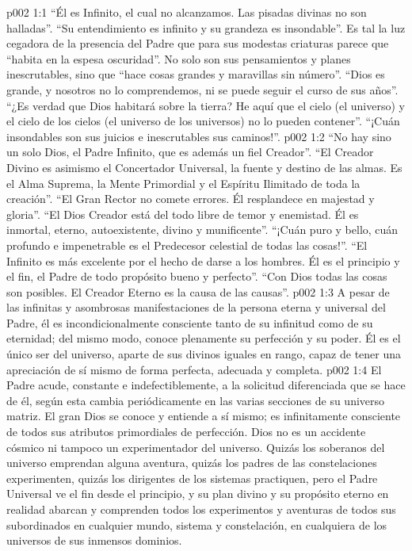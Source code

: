 \vs p002 1:1 “Él es Infinito, el cual no alcanzamos. Las pisadas divinas no son halladas”. “Su entendimiento es infinito y su grandeza es insondable”. Es tal la luz cegadora de la presencia del Padre que para sus modestas criaturas parece que “habita en la espesa oscuridad”. No solo son sus pensamientos y planes inescrutables, sino que “hace cosas grandes y maravillas sin número”. “Dios es grande, y nosotros no lo comprendemos, ni se puede seguir el curso de sus años”. “¿Es verdad que Dios habitará sobre la tierra? He aquí que el cielo (el universo) y el cielo de los cielos (el universo de los universos) no lo pueden contener”. “¡Cuán insondables son sus juicios e inescrutables sus caminos!”.
\vs p002 1:2 “No hay sino un solo Dios, el Padre Infinito, que es además un fiel Creador”. “El Creador Divino es asimismo el Concertador Universal, la fuente y destino de las almas. Es el Alma Suprema, la Mente Primordial y el Espíritu Ilimitado de toda la creación”. “El Gran Rector no comete errores. Él resplandece en majestad y gloria”. “El Dios Creador está del todo libre de temor y enemistad. Él es inmortal, eterno, autoexistente, divino y munificente”. “¡Cuán puro y bello, cuán profundo e impenetrable es el Predecesor celestial de todas las cosas!”. “El Infinito es más excelente por el hecho de darse a los hombres. Él es el principio y el fin, el Padre de todo propósito bueno y perfecto”. “Con Dios todas las cosas son posibles. El Creador Eterno es la causa de las causas”.
\vs p002 1:3 \pc A pesar de las infinitas y asombrosas manifestaciones de la persona eterna y universal del Padre, él es incondicionalmente consciente tanto de su infinitud como de su eternidad; del mismo modo, conoce plenamente su perfección y su poder. Él es el único ser del universo, aparte de sus divinos iguales en rango, capaz de tener una apreciación de sí mismo de forma perfecta, adecuada y completa.
\vs p002 1:4 El Padre acude, constante e indefectiblemente, a la solicitud diferenciada que se hace de él, según esta cambia periódicamente en las varias secciones de su universo matriz. El gran Dios se conoce y entiende a sí mismo; es infinitamente consciente de todos sus atributos primordiales de perfección. Dios no es un accidente cósmico ni tampoco un experimentador del universo. Quizás los soberanos del universo emprendan alguna aventura, quizás los padres de las constelaciones experimenten, quizás los dirigentes de los sistemas practiquen, pero el Padre Universal ve el fin desde el principio, y su plan divino y su propósito eterno en realidad abarcan y comprenden todos los experimentos y aventuras de todos sus subordinados en cualquier mundo, sistema y constelación, en cualquiera de los universos de sus inmensos dominios.

